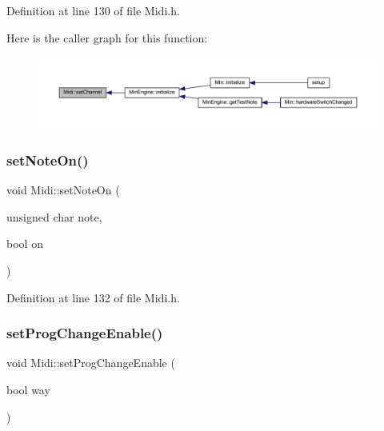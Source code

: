 Definition at line 130 of file Midi.\+h.

Here is the caller graph for this function\+:
\nopagebreak
\begin{figure}[H]
\begin{center}
\leavevmode
\includegraphics[width=350pt]{class_midi_ab4278443129bc124d46a9f06723283a6_icgraph}
\end{center}
\end{figure}
\mbox{\label{class_midi_a981761bdfa5f3f9637cdac108d88ba35}} 
\subsubsection{\texorpdfstring{set\+Note\+On()}{setNoteOn()}}
{\footnotesize\ttfamily void Midi\+::set\+Note\+On (\begin{DoxyParamCaption}\item[{unsigned char}]{note,  }\item[{bool}]{on }\end{DoxyParamCaption})\hspace{0.3cm}{\ttfamily [inline]}}



Definition at line 132 of file Midi.\+h.

\mbox{\label{class_midi_adba21f11f8a0f7d835604ba68a9414ab}} 
\subsubsection{\texorpdfstring{set\+Prog\+Change\+Enable()}{setProgChangeEnable()}}
{\footnotesize\ttfamily void Midi\+::set\+Prog\+Change\+Enable (\begin{DoxyParamCaption}\item[{bool}]{way }\end{DoxyParamCaption})\hspace{0.3cm}{\ttfamily [inline]}}



